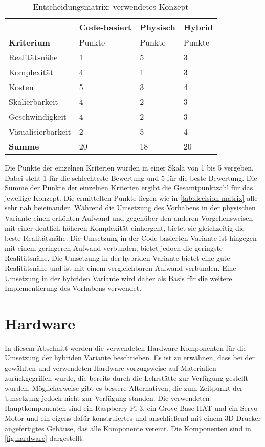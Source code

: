 \begin{table}[H]
    \renewcommand{\arraystretch}{1.2}
    \caption{Entscheidungsmatrix: verwendetes Konzept}
    \label{tab:decision-matrix}
    \begin{tabularx}{\textwidth}{|X|X|X|X|}
        \hline
        & \textbf{Code-basiert} & \textbf{Physisch} & \textbf{Hybrid} \\
        \hline
        \textbf{Kriterium} & Punkte & Punkte & Punkte \\
        \hline
        Realitätsnähe & 1 & 5 & 3 \\
        \hline
        Komplexität & 4 & 1 & 3 \\
        \hline
        Kosten & 5 & 3 & 4 \\
        \hline
        Skalierbarkeit & 4 & 2 & 3 \\
        \hline
        Geschwindigkeit & 4 & 2 & 3 \\
        \hline
        Visualisierbarkeit & 2 & 5 & 4 \\
        \hline
        \rowcolor{gray!50}
        \textbf{Summe} & 20 & 18 & 20 \\
        \hline
    \end{tabularx}
\end{table}

Die Punkte der einzelnen Kriterien wurden in einer Skala von 1 bis 5 vergeben. Dabei steht 1 für die schlechteste Bewertung und 5 für die beste Bewertung. Die Summe der Punkte der einzelnen Kriterien ergibt die Gesamtpunktzahl für das jeweilige Konzept. Die ermittelten Punkte liegen wie in \autoref{tab:decision-matrix} alle sehr nah beieinander. Während die Umsetzung des Vorhabens in der physischen Variante einen erhöhten Aufwand und gegenüber den anderen Vorgehensweisen mit einer deutlich höheren Komplexität einhergeht, bietet sie gleichzeitig die beste Realitätsnähe. Die Umsetzung in der Code-basierten Variante ist hingegen mit einem geringeren Aufwand verbunden, bietet jedoch die geringste Realitätsnähe. Die Umsetzung in der hybriden Variante bietet eine gute Realitätsnähe und ist mit einem vergleichbaren Aufwand verbunden. Eine Umsetzung in der hybriden Variante wird daher als Basis für die weitere Implementierung des Vorhabens verwendet. 

\section{Hardware}
In diesem Abschnitt werden die verwendeten Hardware-Komponenten für die Umsetzung der hybriden Variante beschrieben. Es ist zu erwähnen, dass bei der gewählten und verwendeten Hardware vorzugsweise auf Materialien zurückgegriffen wurde, die bereits durch die Lehrstätte zur Verfügung gestellt wurden. Möglicherweise gibt es bessere Alternativen, die zum Zeitpunkt der Umsetzung jedoch nicht zur Verfügung standen. Die verwendeten Hauptkomponenten sind ein Raspberry Pi 3, ein Grove Base HAT und ein Servo Motor und ein eigens dafür konstruiertes und anschließend mit einem 3D-Drucker angefertigtes Gehäuse, das alle Komponente vereint. Die Komponenten sind in \autoref{fig:hardware} dargestellt.

